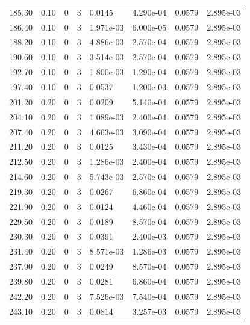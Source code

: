 \documentclass[preview]{standalone}
\begin{document}
{{{\begin{tabular}{L{1.2cm}C{1.2cm} C{0.3cm}C{0.5cm} C{1.4cm}C{1.4cm} C{1.4cm}C{1.4cm}}
  185.30  &  0.10  & 0     &  3 &  0.0145  & 4.290e-04  & 0.0579 &  2.895e-03   \\ 
  186.40  &  0.10  & 0     &  3 &  1.971e-03  & 6.000e-05  & 0.0579 &  2.895e-03   \\ 
  188.20  &  0.10  & 0     &  3 &  4.886e-03  & 2.570e-04  & 0.0579 &  2.895e-03   \\ 
  190.60  &  0.10  & 0     &  3 &  3.514e-03  & 2.570e-04  & 0.0579 &  2.895e-03   \\ 
  192.70  &  0.10  & 0     &  3 &  1.800e-03  & 1.290e-04  & 0.0579 &  2.895e-03   \\ 
  197.40  &  0.10  & 0     &  3 &  0.0537  & 1.200e-03  & 0.0579 &  2.895e-03   \\ 
  201.20  &  0.20  & 0     &  3 &  0.0209  & 5.140e-04  & 0.0579 &  2.895e-03   \\ 
  204.10  &  0.20  & 0     &  3 &  1.089e-03  & 2.400e-04  & 0.0579 &  2.895e-03   \\ 
  207.40  &  0.20  & 0     &  3 &  4.663e-03  & 3.090e-04  & 0.0579 &  2.895e-03   \\ 
  211.20  &  0.20  & 0     &  3 &  0.0125  & 3.430e-04  & 0.0579 &  2.895e-03   \\ 
  212.50  &  0.20  & 0     &  3 &  1.286e-03  & 2.400e-04  & 0.0579 &  2.895e-03   \\ 
  214.60  &  0.20  & 0     &  3 &  5.743e-03  & 2.570e-04  & 0.0579 &  2.895e-03   \\ 
  219.30  &  0.20  & 0     &  3 &  0.0267  & 6.860e-04  & 0.0579 &  2.895e-03   \\ 
  221.90  &  0.20  & 0     &  3 &  0.0124  & 4.460e-04  & 0.0579 &  2.895e-03   \\ 
  229.50  &  0.20  & 0     &  3 &  0.0189  & 8.570e-04  & 0.0579 &  2.895e-03   \\ 
  230.30  &  0.20  & 0     &  3 &  0.0391  & 2.400e-03  & 0.0579 &  2.895e-03   \\ 
  231.40  &  0.20  & 0     &  3 &  8.571e-03  & 1.286e-03  & 0.0579 &  2.895e-03   \\ 
  237.90  &  0.20  & 0     &  3 &  0.0249  & 8.570e-04  & 0.0579 &  2.895e-03   \\ 
  239.80  &  0.20  & 0     &  3 &  0.0281  & 6.860e-04  & 0.0579 &  2.895e-03   \\ 
  242.20  &  0.20  & 0     &  3 &  7.526e-03  & 7.540e-04  & 0.0579 &  2.895e-03   \\ 
  243.10  &  0.20  & 0     &  3 &  0.0814  & 3.257e-03  & 0.0579 &  2.895e-03   \\ 

\end{tabular}}}}
\end{document}
